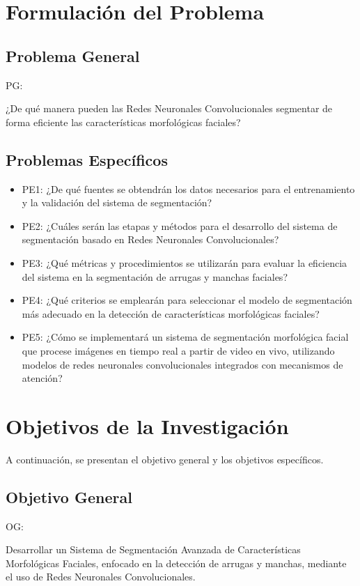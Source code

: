 \section{Formulación del Problema}

\subsection{Problema General}
PG: \newcommand{\ProblemaGeneral}{
¿De qué manera pueden las Redes Neuronales Convolucionales segmentar de forma eficiente las características morfológicas faciales?
}
\ProblemaGeneral

\subsection{Problemas Específicos}
\newcommand{\Pbone}{
¿De qué fuentes se obtendrán los datos necesarios para el entrenamiento y la validación del sistema de segmentación?
}
\newcommand{\Pbtwo}{
¿Cuáles serán las etapas y métodos para el desarrollo del sistema de segmentación basado en Redes Neuronales Convolucionales?
}
\newcommand{\Pbthree}{
¿Qué métricas y procedimientos se utilizarán para evaluar la eficiencia del sistema en la segmentación de arrugas y manchas faciales?
}
\newcommand{\Pbfour}{
¿Qué criterios se emplearán para seleccionar el modelo de segmentación más adecuado en la detección de características morfológicas faciales?
}
\newcommand{\Pbfive}{
¿Cómo se implementará un sistema de segmentación morfológica facial que procese imágenes en tiempo real a partir de video en vivo, utilizando modelos de redes neuronales convolucionales integrados con mecanismos de atención?
}



\begin{itemize}
	\item PE1: {\Pbone}
	\item PE2: {\Pbtwo}
	\item PE3: {\Pbthree}
	\item PE4: {\Pbfour}
	\item PE5: {\Pbfive}
\end{itemize}

\section{Objetivos de la Investigación}
A continuación, se presentan el objetivo general y los objetivos específicos.
\subsection{Objetivo General}
OG: \newcommand{\ObjetivoGeneral}{
Desarrollar un Sistema de Segmentación Avanzada de Características Morfológicas Faciales, enfocado en la detección de arrugas y manchas, mediante el uso de Redes Neuronales Convolucionales.
}
\ObjetivoGeneral
